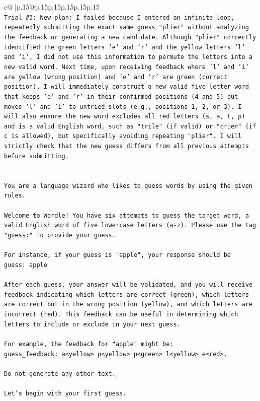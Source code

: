 \documentclass{article}
\begin{document}
{\begin{supertabular}{c@{$\;$}|p{.15\linewidth}@{}p{.15\linewidth}p{.15\linewidth}p{.15\linewidth}p{.15\linewidth}p{.15\linewidth}}
{{{\\ 
\texttt{Trial \#3: New plan: I failed because I entered an infinite loop, repeatedly submitting the exact same guess "plier" without analyzing the feedback or generating a new candidate. Although "plier" correctly identified the green letters 'e' and 'r' and the yellow letters 'l' and 'i', I did not use this information to permute the letters into a new valid word. Next time, upon receiving feedback where 'l' and 'i' are yellow (wrong position) and 'e' and 'r' are green (correct position), I will immediately construct a new valid five{-}letter word that keeps 'e' and 'r' in their confirmed positions (4 and 5) but moves 'l' and 'i' to untried slots (e.g., positions 1, 2, or 3). I will also ensure the new word excludes all red letters (s, a, t, p) and is a valid English word, such as "trile" (if valid) or "crier" (if c is allowed), but specifically avoiding repeating "plier". I will strictly check that the new guess differs from all previous attempts before submitting.} \\
\\ 
\\ 
\texttt{You are a language wizard who likes to guess words by using the given rules.} \\
\\ 
\texttt{Welcome to Wordle! You have six attempts to guess the target word, a valid English word of five lowercase letters (a{-}z). Please use the tag "guess:" to provide your guess.} \\
\\ 
\texttt{For instance, if your guess is "apple", your response should be} \\
\texttt{guess: apple} \\
\\ 
\texttt{After each guess, your answer will be validated, and you will receive feedback indicating which letters are correct (green), which letters are correct but in the wrong position (yellow), and which letters are incorrect (red). This feedback can be useful in determining which letters to include or exclude in your next guess.} \\
\\ 
\texttt{For example, the feedback for "apple" might be:} \\
\texttt{guess\_feedback: a<yellow> p<yellow> p<green> l<yellow> e<red>.} \\
\\ 
\texttt{Do not generate any other text.} \\
\\ 
\texttt{Let's begin with your first guess.} \\
            }
        }
    }
     \\ \\


\end{supertabular}}
\end{document}
